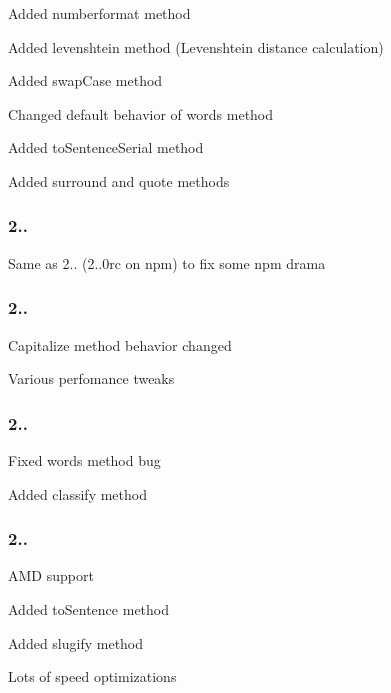 \begin{DoxyItemize}
\item Added {\ttfamily numberformat} method
\item Added {\ttfamily levenshtein} method (Levenshtein distance calculation)
\item Added {\ttfamily swap\+Case} method
\item Changed default behavior of {\ttfamily words} method
\item Added {\ttfamily to\+Sentence\+Serial} method
\item Added {\ttfamily surround} and {\ttfamily quote} methods
\end{DoxyItemize}

\subsubsection*{2..}


\begin{DoxyItemize}
\item Same as 2.. (2..\+0rc on npm) to fix some npm drama
\end{DoxyItemize}

\subsubsection*{2..}


\begin{DoxyItemize}
\item Capitalize method behavior changed
\item Various perfomance tweaks
\end{DoxyItemize}

\subsubsection*{2..}


\begin{DoxyItemize}
\item Fixed words method bug
\item Added classify method
\end{DoxyItemize}

\subsubsection*{2..}


\begin{DoxyItemize}
\item A\+M\+D support
\item Added to\+Sentence method
\item Added slugify method
\item Lots of speed optimizations
\end{DoxyItemize}

